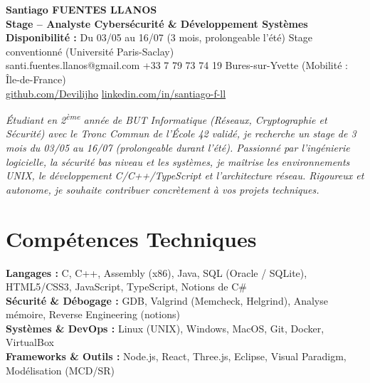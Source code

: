 \documentclass[10pt,a4paper]{article}
\begin{document}
\begin{center}
  {\LARGE\bfseries Santiago FUENTES LLANOS}\\[0.25em]
  {\large\bfseries Stage -- Analyste Cybersécurité \& Développement Systèmes}\\[0.2em]
  {\small\textbf{Disponibilité :} Du 03/05 au 16/07 (3 mois, prolongeable l'été) \textperiodcentered{} Stage conventionné (Université Paris-Saclay)}\\[0.15em]
  {\small santi.fuentes.llanos@gmail.com \textperiodcentered{} +33 7 79 73 74 19 \textperiodcentered{} Bures-sur-Yvette (Mobilité : Île-de-France)}\\
  {\small \href{https://github.com/Devilijho}{github.com/Devilijho} \textperiodcentered{} \href{https://www.linkedin.com/in/santiago-f-ll}{linkedin.com/in/santiago-f-ll}}
\end{center}

\vspace{0.25em}
{\small\itshape
Étudiant en 2\textsuperscript{ème} année de BUT Informatique (Réseaux, Cryptographie et Sécurité) avec le Tronc Commun de l'École 42 validé, je recherche un stage de 3 mois du 03/05 au 16/07 (prolongeable durant l'été). Passionné par l'ingénierie logicielle, la sécurité bas niveau et les systèmes, je maîtrise les environnements UNIX, le développement C/C++/TypeScript et l'architecture réseau. Rigoureux et autonome, je souhaite contribuer concrètement à vos projets techniques.
}

\section*{Compétences Techniques}
{\small
\textbf{Langages :} C, C++, Assembly (x86), Java, SQL (Oracle / SQLite), HTML5/CSS3, JavaScript, TypeScript, Notions de C\#\\
\textbf{Sécurité \& Débogage :} GDB, Valgrind (Memcheck, Helgrind), Analyse mémoire, Reverse Engineering (notions)\\
\textbf{Systèmes \& DevOps :} Linux (UNIX), Windows, MacOS, Git, Docker, VirtualBox\\
\textbf{Frameworks \& Outils :} Node.js, React, Three.js, Eclipse, Visual Paradigm, Modélisation (MCD/SR)
}

\end{document}
